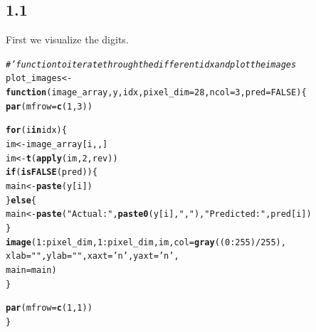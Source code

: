 \documentclass[10pt, a4paper, english]{article}\usepackage[]{graphicx}\usepackage[dvipsnames]{xcolor}
\makeatletter
\newcommand{\hlnum}[1]{\textcolor[rgb]{0.686,0.059,0.569}{#1}}%
\newcommand{\hlstr}[1]{\textcolor[rgb]{0.192,0.494,0.8}{#1}}%
\newcommand{\hlcom}[1]{\textcolor[rgb]{0.678,0.584,0.686}{\textit{#1}}}%
\newcommand{\hlopt}[1]{\textcolor[rgb]{0,0,0}{#1}}%
\newcommand{\hlstd}[1]{\textcolor[rgb]{0.345,0.345,0.345}{#1}}%
\newcommand{\hlkwa}[1]{\textcolor[rgb]{0.161,0.373,0.58}{\textbf{#1}}}%
\newcommand{\hlkwb}[1]{\textcolor[rgb]{0.69,0.353,0.396}{#1}}%
\newcommand{\hlkwc}[1]{\textcolor[rgb]{0.333,0.667,0.333}{#1}}%
\newcommand{\hlkwd}[1]{\textcolor[rgb]{0.737,0.353,0.396}{\textbf{#1}}}%
\newenvironment{kframe}{%
 \def\at@end@of@kframe{}%
 \ifinner\ifhmode%
  \def\at@end@of@kframe{\end{minipage}}%
  \begin{minipage}{\columnwidth}%
 \fi\fi%
 \def\FrameCommand##1{\hskip\@totalleftmargin \hskip-\fboxsep
 \colorbox{shadecolor}{##1}\hskip-\fboxsep
     \hskip-\linewidth \hskip-\@totalleftmargin \hskip\columnwidth}%
 \MakeFramed {\advance\hsize-\width
   \@totalleftmargin\z@ \linewidth\hsize
   \@setminipage}}%
 {\par\unskip\endMakeFramed%
 \at@end@of@kframe}
\newenvironment{knitrout}{}{} %
\makeatother
\begin{document}
\subsection{1.1}
First we visualize the digits.
\begin{knitrout}
\color{fgcolor}\begin{kframe}
\begin{alltt}
\hlcom{#' function to iterate through the different idx and plot the images}
\hlstd{plot_images} \hlkwb{<-} \hlkwa{function}\hlstd{(}\hlkwc{image_array}\hlstd{,} \hlkwc{y}\hlstd{,} \hlkwc{idx}\hlstd{,} \hlkwc{pixel_dim} \hlstd{=} \hlnum{28}\hlstd{,} \hlkwc{ncol} \hlstd{=} \hlnum{3}\hlstd{,} \hlkwc{pred}\hlstd{=}\hlnum{FALSE}\hlstd{) \{}
  \hlkwd{par}\hlstd{(}\hlkwc{mfrow} \hlstd{=}\hlkwd{c}\hlstd{(}\hlnum{1}\hlstd{,}\hlnum{3}\hlstd{))}

  \hlkwa{for} \hlstd{(i} \hlkwa{in} \hlstd{idx) \{}
    \hlstd{im} \hlkwb{<-} \hlstd{image_array[i,,]}
    \hlstd{im} \hlkwb{<-} \hlkwd{t}\hlstd{(}\hlkwd{apply}\hlstd{(im,} \hlnum{2}\hlstd{, rev))}
    \hlkwa{if} \hlstd{(}\hlkwd{isFALSE}\hlstd{(pred))\{}
      \hlstd{main} \hlkwb{<-} \hlkwd{paste}\hlstd{(y[i])}
    \hlstd{\}} \hlkwa{else}\hlstd{\{}
\hlstd{main} \hlkwb{<-} \hlkwd{paste}\hlstd{(}\hlstr{"Actual: "}\hlstd{,} \hlkwd{paste0}\hlstd{(y[i],}\hlstr{","}\hlstd{),} \hlstr{"Predicted:"}\hlstd{, pred[i])}
    \hlstd{\}}
  \hlkwd{image}\hlstd{(}\hlnum{1}\hlopt{:}\hlstd{pixel_dim,} \hlnum{1}\hlopt{:}\hlstd{pixel_dim, im,} \hlkwc{col} \hlstd{=} \hlkwd{gray}\hlstd{((}\hlnum{0}\hlopt{:}\hlnum{255}\hlstd{)}\hlopt{/}\hlnum{255}\hlstd{),}
            \hlkwc{xlab} \hlstd{=} \hlstr{""}\hlstd{,} \hlkwc{ylab} \hlstd{=} \hlstr{""}\hlstd{,} \hlkwc{xaxt} \hlstd{=} \hlstr{'n'}\hlstd{,} \hlkwc{yaxt} \hlstd{=} \hlstr{'n'}\hlstd{,}
        \hlkwc{main} \hlstd{= main)}
  \hlstd{\}}

  \hlkwd{par}\hlstd{(}\hlkwc{mfrow} \hlstd{=} \hlkwd{c}\hlstd{(}\hlnum{1}\hlstd{,} \hlnum{1}\hlstd{))}
\hlstd{\}}
\end{alltt}
\end{kframe}
\end{knitrout}
\end{document}
